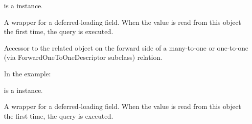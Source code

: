 \documentclass[letterpaper,10pt,english]{sphinxmanual}
\begin{document}
\begin{fulllineitems}
\begin{fulllineitems}
 is a  instance.

\end{fulllineitems}


\begin{fulllineitems}
\label{\detokenize{modules/models:gestion.models.HistoricalReload.coopeman_id}}
A wrapper for a deferred-loading field. When the value is read from this
object the first time, the query is executed.

\end{fulllineitems}


\begin{fulllineitems}
\label{\detokenize{modules/models:gestion.models.HistoricalReload.customer}}
Accessor to the related object on the forward side of a many-to-one or
one-to-one (via ForwardOneToOneDescriptor subclass) relation.

In the example:

\begin{sphinxVerbatim}[commandchars=\\\{\}]
 
       
\end{sphinxVerbatim}

 is a  instance.

\end{fulllineitems}


\begin{fulllineitems}
\label{\detokenize{modules/models:gestion.models.HistoricalReload.customer_id}}
A wrapper for a deferred-loading field. When the value is read from this
object the first time, the query is executed.


\end{fulllineitems}
\end{fulllineitems}
\end{document}
